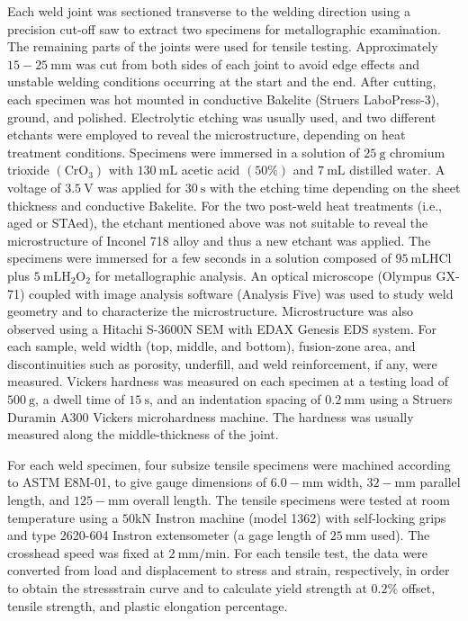 \documentclass[10pt]{article}
\begin{document}
Each weld joint was sectioned transverse to the welding direction using a precision cut-off saw to extract two specimens for metallographic examination. The remaining parts of the joints were used for tensile testing. Approximately $15-25 \mathrm{~mm}$ was cut from both sides of each joint to avoid edge effects and unstable welding conditions occurring at the start and the end. After cutting, each specimen was hot mounted in conductive Bakelite (Struers LaboPress-3), ground, and polished. Electrolytic etching was usually used, and two different etchants were employed to reveal the microstructure, depending on heat treatment conditions. Specimens were immersed in a solution of $25 \mathrm{~g}$ chromium trioxide $\left(\mathrm{CrO}_{3}\right)$ with $130 \mathrm{~mL}$ acetic acid $(50 \%)$ and $7 \mathrm{~mL}$ distilled water. A voltage of $3.5 \mathrm{~V}$ was applied for $30 \mathrm{~s}$ with the etching time depending on the sheet thickness and conductive Bakelite. For the two post-weld heat treatments (i.e., aged or STAed), the etchant mentioned above was not suitable to reveal the microstructure of Inconel 718 alloy and thus a new etchant was applied. The specimens were immersed for a few seconds in a solution composed of $95 \mathrm{~mL} \mathrm{HCl}$ plus $5 \mathrm{~mL} \mathrm{H}_{2} \mathrm{O}_{2}$ for metallographic analysis. An optical microscope (Olympus GX-71) coupled with image analysis software (Analysis Five) was used to study weld geometry and to characterize the microstructure. Microstructure was also observed using a Hitachi S-3600N SEM with EDAX Genesis EDS system. For each sample, weld width (top, middle, and bottom), fusion-zone area, and discontinuities such as porosity, underfill, and weld reinforcement, if any, were measured. Vickers hardness was measured on each specimen at a testing load of $500 \mathrm{~g}$, a dwell time of $15 \mathrm{~s}$, and an indentation spacing of $0.2 \mathrm{~mm}$ using a Struers Duramin A300 Vickers microhardness machine. The hardness was usually measured along the middle-thickness of the joint.

For each weld specimen, four subsize tensile specimens were machined according to ASTM E8M-01, to give gauge dimensions of $6.0-\mathrm{mm}$ width, $32-\mathrm{mm}$ parallel length, and $125-\mathrm{mm}$ overall length. The tensile specimens were tested at room temperature using a $50 \mathrm{kN}$ Instron machine (model 1362) with self-locking grips and type 2620-604 Instron extensometer (a gage length of $25 \mathrm{~mm}$ used). The crosshead speed was fixed at $2 \mathrm{~mm} / \mathrm{min}$. For each tensile test, the data were converted from load and displacement to stress and strain, respectively, in order to obtain the stressstrain curve and to calculate yield strength at $0.2 \%$ offset, tensile strength, and plastic elongation percentage.
\end{document}
